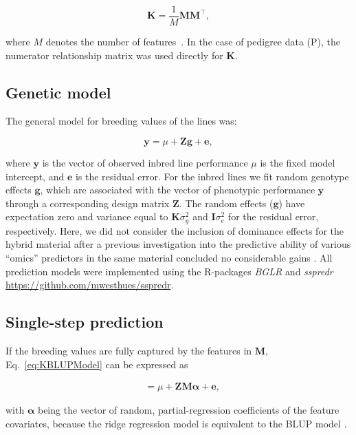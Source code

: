 \documentclass[12pt,titlepage]{article}
\begin{document}
\begin{equation} \label{eq:GenomicRelationship}
  \mathbf{K} = \frac{1}{M} \mathbf{M} \mathbf{M}^{\top},
\end{equation}

where $M$ denotes the number of features~\cite{VanRaden2008}.
In the case of pedigree data (P), the numerator relationship matrix was used
directly for $\mathbf{K}$.


\subsection{Genetic model}
The general model for breeding values of the lines was:

\begin{equation} \label{eq:KBLUPModel}
  \mathbf{y} = \mu + \mathbf{Z} \mathbf{g} + \mathbf{e},
\end{equation}

where $\mathbf{y}$ is the vector of observed inbred line performance $\mu$ is
the fixed model intercept, and $\mathbf{e}$ is the residual error.
For the inbred lines we fit random genotype effects $\mathbf{g}$, which are
associated with the vector of phenotypic performance $\mathbf{y}$ through a
corresponding design matrix $\mathbf{Z}$.
The random effects ($\mathbf{g}$) have expectation zero and variance equal to
$\mathbf{K} \sigma^{2}_{g}$ and $\mathbf{I} \sigma^2_{e}$ for the residual
error, respectively.
Here, we did not consider the inclusion of dominance effects for the hybrid
material after a previous investigation into the predictive ability of various
``omics'' predictors in the same material concluded no considerable gains 
\cite{Westhues2017}.
All prediction models were implemented using the R-packages \textit{BGLR}
\cite{Perez2014} and \textit{sspredr}
\url{https://github.com/mwesthues/sspredr}.


\subsection{Single-step prediction}
If the breeding values are fully captured by the features in $\mathbf{M}$,
Eq.~\ref{eq:KBLUPModel} can be expressed as~\cite{Fernando2014} 

\begin{align} \label{eq:KBLUPModelSimplified}
	&= \mu + \mathbf{Z} \mathbf{M} \boldsymbol{\alpha} + \boldsymbol{e},
\end{align}

with $\boldsymbol{\alpha}$ being the vector of random, partial-regression
coefficients of the feature covariates, because the ridge regression model is
equivalent to the BLUP model \cite{Ruppert2003}.
\end{document}

